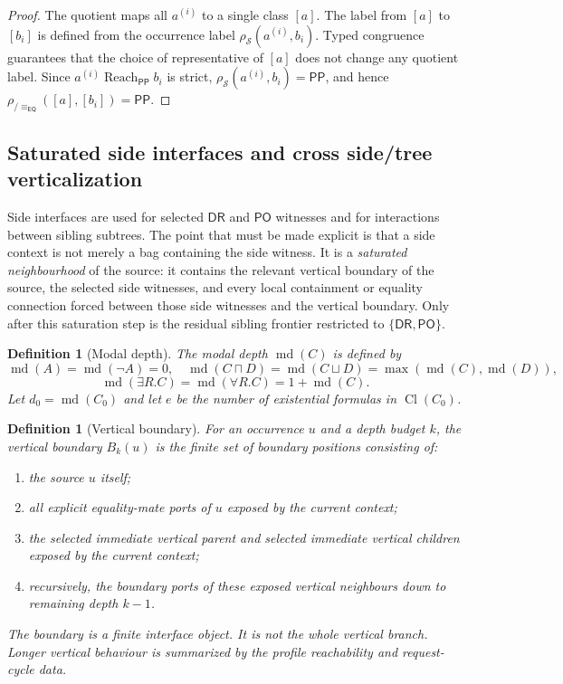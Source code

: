 \documentclass[11pt]{article}
\newtheorem{definition}[theorem]{Definition}
\newcommand{\EQ}{\mathsf{EQ}}
\newcommand{\DR}{\mathsf{DR}}
\newcommand{\PO}{\mathsf{PO}}
\newcommand{\PP}{\mathsf{PP}}
\newcommand{\Cl}{\operatorname{Cl}}
\newcommand{\md}{\operatorname{md}}
\newcommand{\eqc}{\equiv_{\EQ}}
\newcommand{\reach}{\operatorname{Reach}}
\begin{document}
\begin{proof}
The quotient maps all $a^{(i)}$ to a single class $[a]$.  The label from $[a]$ to $[b_i]$ is defined from the occurrence label $\rho_\mathcal S(a^{(i)},b_i)$.  Typed congruence guarantees that the choice of representative of $[a]$ does not change any quotient label.  Since $a^{(i)}\reach_\PP b_i$ is strict, $\rho_\mathcal S(a^{(i)},b_i)=\PP$, and hence $\rho_{/\eqc}([a],[b_i])=\PP$.
\end{proof}


\subsection{Saturated side interfaces and cross side/tree verticalization}\label{subsec:saturated-side}

Side interfaces are used for selected $\DR$ and $\PO$ witnesses and for interactions between sibling subtrees.  The point that must be made explicit is that a side context is not merely a bag containing the side witness.  It is a \emph{saturated neighbourhood} of the source: it contains the relevant vertical boundary of the source, the selected side witnesses, and every local containment or equality connection forced between those side witnesses and the vertical boundary.  Only after this saturation step is the residual sibling frontier restricted to $\{\DR,\PO\}$.

\begin{definition}[Modal depth]
The modal depth $\md(C)$ is defined by
\[
\md(A)=\md(\neg A)=0,
\quad
\md(C\sqcap D)=\md(C\sqcup D)=\max(\md(C),\md(D)),
\]
\[
\md(\exists R.C)=\md(\forall R.C)=1+\md(C).
\]
Let $d_0=\md(C_0)$ and let $e$ be the number of existential formulas in $\Cl(C_0)$.
\end{definition}

\begin{definition}[Vertical boundary]\label{def:vertical-boundary}
For an occurrence $u$ and a depth budget $k$, the vertical boundary $B_k(u)$ is the finite set of boundary positions consisting of:
\begin{enumerate}[label=(B\arabic*)]
\item the source $u$ itself;
\item all explicit equality-mate ports of $u$ exposed by the current context;
\item the selected immediate vertical parent and selected immediate vertical children exposed by the current context;
\item recursively, the boundary ports of these exposed vertical neighbours down to remaining depth $k-1$.
\end{enumerate}
The boundary is a finite interface object.  It is not the whole vertical branch.  Longer vertical behaviour is summarized by the profile reachability and request-cycle data.
\end{definition}
\end{document}
